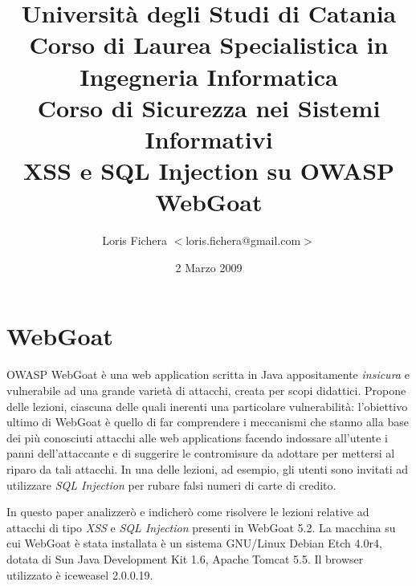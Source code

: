 \documentclass[a4paper,openright,italian]{article}
\begin{document}
\title{Universit\`a degli Studi di Catania \\ Corso di Laurea Specialistica in Ingegneria Informatica \\ Corso di Sicurezza nei Sistemi Informativi \\ XSS e SQL Injection su OWASP WebGoat}
\author{Loris Fichera $<$loris.fichera@gmail.com$>$}
\date{2 Marzo 2009}

\pagestyle{empty}
\maketitle
\thispagestyle{empty}

\section{WebGoat}
OWASP\cite{OWASP} WebGoat\cite{WebGoat} \`e una web application scritta in Java appositamente {\it insicura} e vulnerabile ad una grande variet\`a di attacchi, creata per scopi didattici. \newline Propone delle lezioni, ciascuna delle quali inerenti una particolare vulnerabilit\`a: l'obiettivo ultimo di WebGoat \`e quello di far comprendere i meccanismi che stanno alla base dei pi\`u conosciuti attacchi alle web applications facendo indossare all'utente i panni dell'attaccante e di suggerire le contromisure da adottare per mettersi al riparo da tali attacchi. In una delle lezioni, ad esempio, gli utenti sono invitati ad utilizzare {\it SQL Injection} per rubare falsi numeri di carte di credito.

In questo paper analizzer\`o e indicher\`o come risolvere le lezioni relative ad attacchi di tipo \emph{XSS} e \emph{SQL Injection} presenti in WebGoat 5.2. La macchina su cui WebGoat \`e stata installata \`e un sistema GNU/Linux Debian Etch 4.0r4\cite{Debian}, dotata di Sun Java Development Kit 1.6, Apache Tomcat 5.5\cite{tomcat}. Il browser utilizzato \`e iceweasel\cite{iceweasel} 2.0.0.19.
\end{document}
